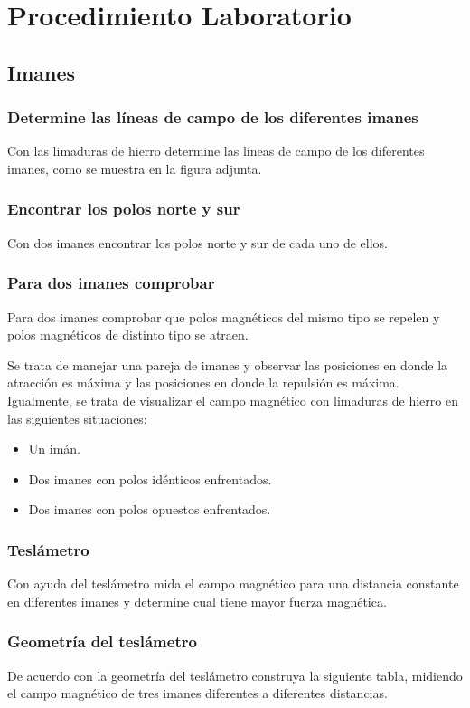 \section{Procedimiento Laboratorio} 
\subsection{Imanes}

\subsubsection{Determine las líneas de campo de los diferentes imanes}
Con las limaduras de hierro determine las líneas de campo de los diferentes
imanes, como se muestra en la figura adjunta.


\subsubsection{Encontrar los polos norte y sur}
Con dos imanes encontrar los polos norte y sur de cada uno de ellos.


\subsubsection{Para dos imanes comprobar}
Para dos imanes comprobar que polos magnéticos del mismo tipo se repelen y polos
magnéticos de distinto tipo se atraen.

Se trata de manejar una pareja de imanes y observar las posiciones en donde la
atracción es máxima y las posiciones en donde la repulsión es máxima.
Igualmente, se trata de visualizar el campo magnético con limaduras de hierro en
las siguientes situaciones:

\begin{itemize}
    \item Un imán.
    \item Dos imanes con polos idénticos enfrentados.
    \item Dos imanes con polos opuestos enfrentados.
\end{itemize}


\subsubsection{Teslámetro}
Con ayuda del teslámetro mida el campo magnético para una distancia constante en
diferentes imanes y determine cual tiene mayor fuerza magnética.


\subsubsection{Geometría del teslámetro}
De acuerdo con la geometría del teslámetro construya la siguiente tabla,
midiendo el campo magnético de tres imanes diferentes a diferentes distancias.


